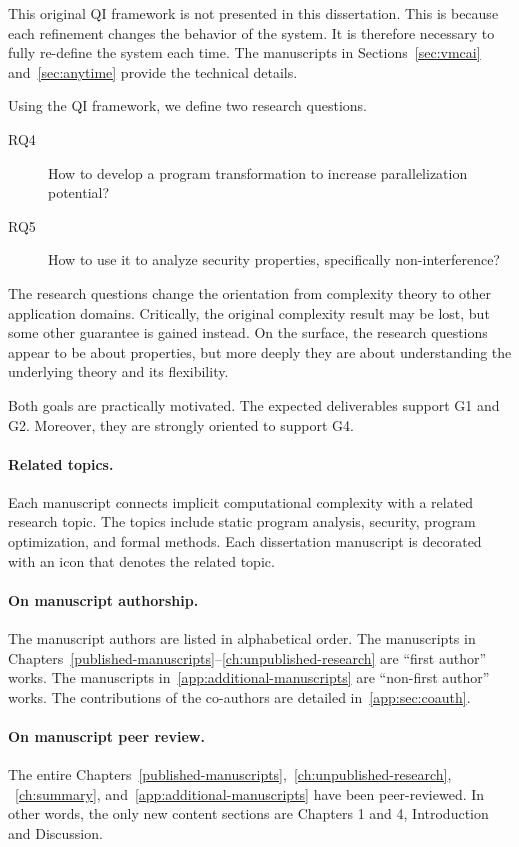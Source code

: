 This original QI framework is not presented in this dissertation. This is
because each refinement changes the behavior of the system. It is therefore
necessary to fully re-define the system each time. The manuscripts in
Sections~\ref{sec:vmcai} and~\ref{sec:anytime} provide the technical details.

Using the QI framework, we define two research questions.
\begin{description}
\item[RQ4] How to develop a program transformation to increase parallelization
potential?
\item[RQ5] How to use it to analyze security properties, specifically
non-interference?
\end{description}

The research questions change the orientation from complexity theory to other
application domains. Critically, the original complexity result may be lost, but
some other guarantee is gained instead. On the surface, the research questions
appear to be about properties, but more deeply they are about understanding the
underlying theory and its flexibility.

Both goals are practically motivated. The expected deliverables support G1 and
G2. Moreover, they are strongly oriented to support G4.

\paragraph*{Related topics.}
Each manuscript connects implicit computational complexity with a related
research topic. The topics include static program analysis, security, program
optimization, and formal methods. Each dissertation manuscript is decorated with
an icon that denotes the related topic.

\paragraph*{On manuscript authorship.}
The manuscript authors are listed in alphabetical order. The manuscripts in
Chapters~\ref{published-manuscripts}--\ref{ch:unpublished-research} are
\enquote{first author} works. The manuscripts
in~\autoref{app:additional-manuscripts} are \enquote{non-first author} works.
The contributions of the co-authors are detailed in~\autoref{app:sec:coauth}.

\paragraph*{On manuscript peer review.}
The entire Chapters~\ref{published-manuscripts},~\ref{ch:unpublished-research},%
~\ref{ch:summary}, and~\ref{app:additional-manuscripts} have been peer-reviewed.
In other words, the only new content sections are Chapters 1 and 4, Introduction
and Discussion.

